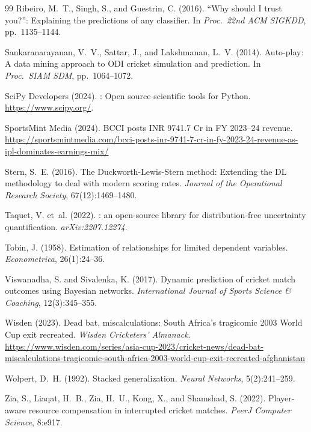 \documentclass[10pt,a4paper,twocolumn]{article}
\begin{document}
\begin{thebibliography}{99}
Ribeiro, M.~T., Singh, S., and Guestrin, C. (2016).
\newblock ``{W}hy should {I} trust you?'': Explaining the predictions of any classifier.
\newblock In \emph{Proc.\ 22nd ACM SIGKDD}, pp.~1135--1144.

Sankaranarayanan, V.~V., Sattar, J., and Lakshmanan, L.~V. (2014).
\newblock Auto-play: A data mining approach to ODI cricket simulation and prediction.
\newblock In \emph{Proc.\ SIAM SDM}, pp.~1064--1072.

{SciPy Developers} (2024).
: Open source scientific tools for {Python}. \url{https://www.scipy.org/}.

SportsMint Media (2024).
\newblock BCCI posts INR 9741.7 Cr in FY 2023--24 revenue.
\newblock \url{https://sportsmintmedia.com/bcci-posts-inr-9741-7-cr-in-fy-2023-24-revenue-as-ipl-dominates-earnings-mix/}

Stern, S.~E. (2016).
\newblock The Duckworth-Lewis-Stern method: Extending the DL methodology to deal with modern scoring rates.
\newblock \emph{Journal of the Operational Research Society}, 67(12):1469--1480.

Taquet, V. et~al. (2022).
: an open-source library for distribution-free uncertainty quantification.
\newblock \emph{arXiv:2207.12274}.

Tobin, J. (1958).
\newblock Estimation of relationships for limited dependent variables.
\newblock \emph{Econometrica}, 26(1):24--36.

Viswanadha, S. and Sivalenka, K. (2017).
\newblock Dynamic prediction of cricket match outcomes using Bayesian networks.
\newblock \emph{International Journal of Sports Science \& Coaching}, 12(3):345--355.

Wisden (2023).
\newblock Dead bat, miscalculations: South Africa's tragicomic 2003 World Cup exit recreated.
\newblock \emph{Wisden Cricketers' Almanack}. \url{https://www.wisden.com/series/asia-cup-2023/cricket-news/dead-bat-miscalculations-tragicomic-south-africa-2003-world-cup-exit-recreated-afghanistan}

Wolpert, D.~H. (1992).
\newblock Stacked generalization.
\newblock \emph{Neural Networks}, 5(2):241--259.

Zia, S., Liaqat, H.~B., Zia, H.~U., Kong, X., and Shamshad, S. (2022).
\newblock Player-aware resource compensation in interrupted cricket matches.
\newblock \emph{PeerJ Computer Science}, 8:e917.

\end{thebibliography}
\end{document}
